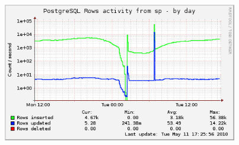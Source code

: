 \documentclass[english]{beamer}
\begin{document}
\begin{frame}[fragile]
\begin{overprint}
  \begin{center} 
    \includegraphics[height=2.4in]{sp2n-pg_user_tables_activity_sp-day.png}
  \end{center} 

  \end{overprint}  
\end{frame}
\end{document}
